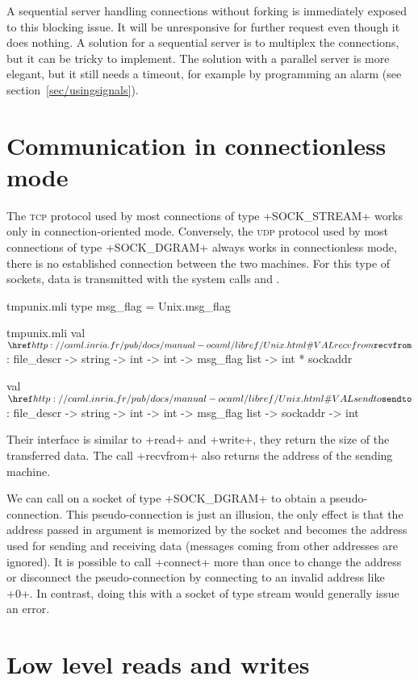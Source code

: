 A sequential server handling connections without forking is
immediately exposed to this blocking issue. It will be unresponsive for
further request even though it does nothing. A solution for a
sequential server is to multiplex the connections, but it can be
tricky to implement. The solution with a parallel server is more
elegant, but it still needs a timeout, for example by programming an alarm
(see section~\ref{sec/usingsignals}).


\section{\label{sec/mode-deconnecte}Communication in connectionless mode}

The \textsc{tcp} protocol used by most connections of type
\ml+SOCK_STREAM+ works only in connection-oriented mode. Conversely,
the \textsc{udp} protocol used by most connections of type
\ml+SOCK_DGRAM+ always works in connectionless mode, there is
no established connection between the two machines. For this type of
sockets, data is transmitted with the system calls  
and .
%
\begin{codefile}{tmpunix.mli}
type msg_flag = Unix.msg_flag
\end{codefile}
%
\begin{listingcodefile}{tmpunix.mli}
val $\libvalue{Unix}{recvfrom}$ :
  file_descr -> string -> int -> int -> msg_flag list -> int * sockaddr

val $\libvalue{Unix}{sendto}$ :
  file_descr -> string -> int -> int -> msg_flag list -> sockaddr -> int
\end{listingcodefile}
% 
Their interface is similar to \ml+read+ and \ml+write+, they
return the size of the transferred data. The
call \ml+recvfrom+ also returns the address of the sending machine.

We can call  on a socket of type \ml+SOCK_DGRAM+
to obtain a pseudo-connection. This pseudo-connection is just an
illusion, the only effect is that the address passed in argument is
memorized by the socket and becomes the address used for sending and
receiving data (messages coming from other addresses are ignored). It
is possible to call \ml+connect+ more than once to change the address
or disconnect the pseudo-connection by connecting to an invalid
address like \ml+0+. In contrast, doing this with a socket of type stream
would generally issue an error.

\section{Low level reads and writes}

